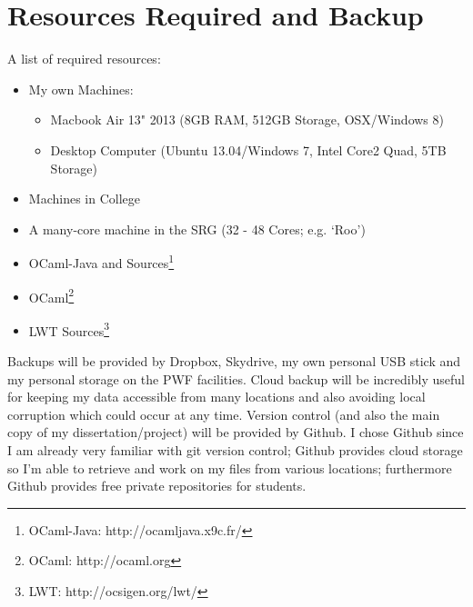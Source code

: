 \documentclass[a4paper]{article}
\begin{document}
\section{Resources Required and Backup}
\label{sec:resources}
A list of required resources:
\begin{itemize}
\item{My own Machines:
    \begin{itemize}
    \item{Macbook Air 13" 2013 (8GB RAM, 512GB Storage, OSX/Windows 8)}
    \item{Desktop Computer (Ubuntu 13.04/Windows 7, Intel Core2 Quad, 5TB Storage)}
    \end{itemize}
}
\item{Machines in College}
\item{A many-core machine in the SRG (32 - 48 Cores; e.g. `Roo')}
\item{OCaml-Java and Sources\footnote{OCaml-Java: http://ocamljava.x9c.fr/}}
\item{OCaml\footnote{OCaml: http://ocaml.org}}
\item{LWT Sources\footnote{LWT: http://ocsigen.org/lwt/}}
\end{itemize}

Backups will be provided by Dropbox, Skydrive, my own personal USB stick and my personal storage on the PWF facilities. Cloud backup will be incredibly useful for keeping my data accessible from many locations and also avoiding local corruption which could occur at any time.
Version control (and also the main copy of my dissertation/project) will be provided by Github. I chose Github since I am already very familiar with git version control; Github provides cloud storage so I'm able to retrieve and work on my files from various locations; furthermore Github provides free private repositories for students.



\end{document}
